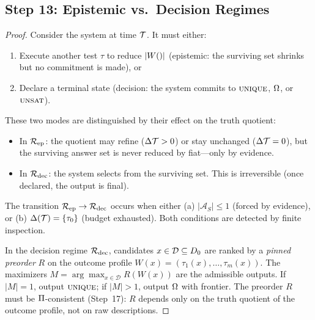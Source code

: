 
\subsection{Step 13: Epistemic vs.\ Decision Regimes}\label{app:step13}

\begin{proof}
Consider the system at time $\mathcal{T}$.  It must either:
\begin{enumerate}[nosep, label=(\alph*)]
  \item Execute another test $\tau$ to reduce $|W()|$ (epistemic: the
        surviving set shrinks but no commitment is made), or
  \item Declare a terminal state (decision: the system commits to
        $\textsc{unique}$, $\Omega$, or $\textsc{unsat}$).
\end{enumerate}

These two modes are distinguished by their effect on the truth quotient:
\begin{itemize}[nosep]
  \item In $\mathcal{R}_{\mathrm{ep}}$: the quotient may refine ($\Delta\mathcal{T} > 0$) or stay
        unchanged ($\Delta\mathcal{T} = 0$), but the surviving answer set is never
        reduced by fiat---only by evidence.
  \item In $\mathcal{R}_{\mathrm{dec}}$: the system selects from the surviving set.  This is
        irreversible (once declared, the output is final).
\end{itemize}

The transition $\mathcal{R}_{\mathrm{ep}} \to \mathcal{R}_{\mathrm{dec}}$ occurs when either (a)
$|\mathcal{A}_S| \leq 1$ (forced by evidence), or (b)
$\Delta(\mathcal{T}) = \{\tau_0\}$ (budget exhausted).  Both conditions are
detected by finite inspection.

In the decision regime $\mathcal{R}_{\mathrm{dec}}$, candidates $x \in \mathcal{D}
\subseteq D_0$ are ranked by a \emph{pinned preorder} $R$ on
the outcome profile $W(x) = (\tau_1(x), \ldots, \tau_m(x))$.  The
maximizers $M = \arg\max_{x \in \mathcal{D}} R(W(x))$ are the
admissible outputs.  If $|M| = 1$, output $\textsc{unique}$; if $|M| > 1$,
output $\Omega$ with frontier.  The preorder $R$ must be
$\Pi$-consistent (Step~17): $R$ depends only on the truth
quotient of the outcome profile, not on raw descriptions.

\end{proof}

